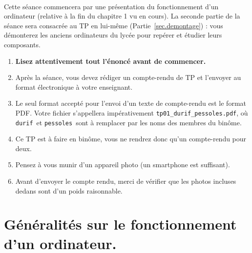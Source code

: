 \exer{[ARCHI-000]}
\setcounter{numques}{0}~\\

Cette séance commencera par une présentation du fonctionnement d'un ordinateur (relative à la fin du chapitre 1 vu en cours). 
La seconde partie de la séance sera consacrée au TP en lui-même (Partie~\ref{sec.demontage}) : vous 
démonterez les anciens ordinateurs du lycée pour repérer et étudier leurs composants. 

\begin{enumerate}
\item  \textbf{Lisez attentivement  tout l'énoncé
    avant de commencer.}
\item Après la séance, vous devez rédiger un compte-rendu de TP et
l'envoyer au format électronique à votre enseignant.
\item Le seul format accepté pour l'envoi d'un texte de compte-rendu est le
format PDF. Votre fichier s'appellera impérativement \texttt{tp01\_durif\_pessoles.pdf}, où \og \texttt{durif}\fg\ et \og \texttt{pessoles}\fg\ sont à remplacer par les noms des membres du binôme. 
\item Ce TP est à faire en binôme, vous ne rendrez donc qu'un
  compte-rendu pour deux.
\item Pensez à vous munir d'un appareil photo (un smartphone est suffisant).
\item Avant d'envoyer le compte rendu, merci de vérifier que les photos incluses dedans sont d'un poids raisonnable.
\end{enumerate}

\section{Généralités sur le fonctionnement d'un ordinateur.}\label{sec.ordi}




